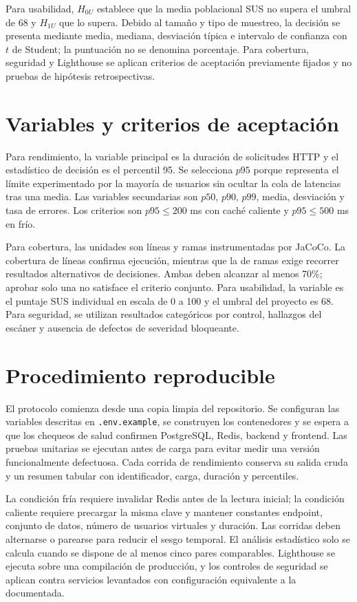 \documentclass[11pt,a4paper]{report}
\begin{document}
Para usabilidad, $H_{0U}$ establece que la media poblacional SUS no supera el umbral de 68 y $H_{1U}$ que lo supera. Debido al tamaño y tipo de muestreo, la decisión se presenta mediante media, mediana, desviación típica e intervalo de confianza con $t$ de Student; la puntuación no se denomina porcentaje. Para cobertura, seguridad y Lighthouse se aplican criterios de aceptación previamente fijados y no pruebas de hipótesis retrospectivas.

\section{Variables y criterios de aceptación}
Para rendimiento, la variable principal es la duración de solicitudes HTTP y el estadístico de decisión es el percentil 95. Se selecciona $p95$ porque representa el límite experimentado por la mayoría de usuarios sin ocultar la cola de latencias tras una media. Las variables secundarias son $p50$, $p90$, $p99$, media, desviación y tasa de errores. Los criterios son $p95 \le 200$ ms con caché caliente y $p95 \le 500$ ms en frío.

Para cobertura, las unidades son líneas y ramas instrumentadas por JaCoCo. La cobertura de líneas confirma ejecución, mientras que la de ramas exige recorrer resultados alternativos de decisiones. Ambas deben alcanzar al menos 70\%; aprobar solo una no satisface el criterio conjunto. Para usabilidad, la variable es el puntaje SUS individual en escala de 0 a 100 y el umbral del proyecto es 68. Para seguridad, se utilizan resultados categóricos por control, hallazgos del escáner y ausencia de defectos de severidad bloqueante.

\section{Procedimiento reproducible}
El protocolo comienza desde una copia limpia del repositorio. Se configuran las variables descritas en \texttt{.env.example}, se construyen los contenedores y se espera a que los chequeos de salud confirmen PostgreSQL, Redis, backend y frontend. Las pruebas unitarias se ejecutan antes de carga para evitar medir una versión funcionalmente defectuosa. Cada corrida de rendimiento conserva su salida cruda y un resumen tabular con identificador, carga, duración y percentiles.

La condición fría requiere invalidar Redis antes de la lectura inicial; la condición caliente requiere precargar la misma clave y mantener constantes endpoint, conjunto de datos, número de usuarios virtuales y duración. Las corridas deben alternarse o parearse para reducir el sesgo temporal. El análisis estadístico solo se calcula cuando se dispone de al menos cinco pares comparables. Lighthouse se ejecuta sobre una compilación de producción, y los controles de seguridad se aplican contra servicios levantados con configuración equivalente a la documentada.
\end{document}
